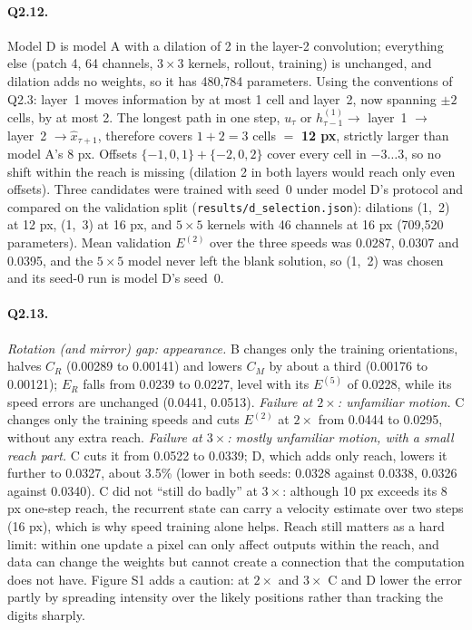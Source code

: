 \paragraph{Q2.12.} Model D is model A with a dilation of 2 in the layer-2 convolution; everything else (patch 4, 64 channels, $3\times3$ kernels, rollout, training) is unchanged, and dilation adds no weights, so it has 480,784 parameters. Using the conventions of Q2.3: layer~1 moves information by at most 1 cell and layer~2, now spanning $\pm2$ cells, by at most 2. The longest path in one step, $u_\tau$ or $h^{(1)}_{\tau-1}\to$ layer~1 $\to$ layer~2 $\to\hat x_{\tau+1}$, therefore covers $1+2=3$ cells $=$ \textbf{12 px}, strictly larger than model A's 8 px. Offsets $\{-1,0,1\}+\{-2,0,2\}$ cover every cell in $-3\ldots3$, so no shift within the reach is missing (dilation 2 in both layers would reach only even offsets). Three candidates were trained with seed~0 under model D's protocol and compared on the validation split (\texttt{results/d\_selection.json}): dilations (1,~2) at 12 px, (1,~3) at 16 px, and $5\times5$ kernels with 46 channels at 16 px (709,520 parameters). Mean validation $E^{(2)}$ over the three speeds was 0.0287, 0.0307 and 0.0395, and the $5\times5$ model never left the blank solution, so (1,~2) was chosen and its seed-0 run is model D's seed~0.

\paragraph{Q2.13.} \emph{Rotation (and mirror) gap: appearance.} B changes only the training orientations, halves $C_R$ (0.00289 to 0.00141) and lowers $C_M$ by about a third (0.00176 to 0.00121); $E_R$ falls from 0.0239 to 0.0227, level with its $E^{(5)}$ of 0.0228, while its speed errors are unchanged (0.0441, 0.0513). \emph{Failure at $2\times$: unfamiliar motion.} C changes only the training speeds and cuts $E^{(2)}$ at $2\times$ from 0.0444 to 0.0295, without any extra reach. \emph{Failure at $3\times$: mostly unfamiliar motion, with a small reach part.} C cuts it from 0.0522 to 0.0339; D, which adds only reach, lowers it further to 0.0327, about 3.5\% (lower in both seeds: 0.0328 against 0.0338, 0.0326 against 0.0340). C did not ``still do badly'' at $3\times$: although 10 px exceeds its 8 px one-step reach, the recurrent state can carry a velocity estimate over two steps (16 px), which is why speed training alone helps. Reach still matters as a hard limit: within one update a pixel can only affect outputs within the reach, and data can change the weights but cannot create a connection that the computation does not have. Figure S1 adds a caution: at $2\times$ and $3\times$ C and D lower the error partly by spreading intensity over the likely positions rather than tracking the digits sharply.

